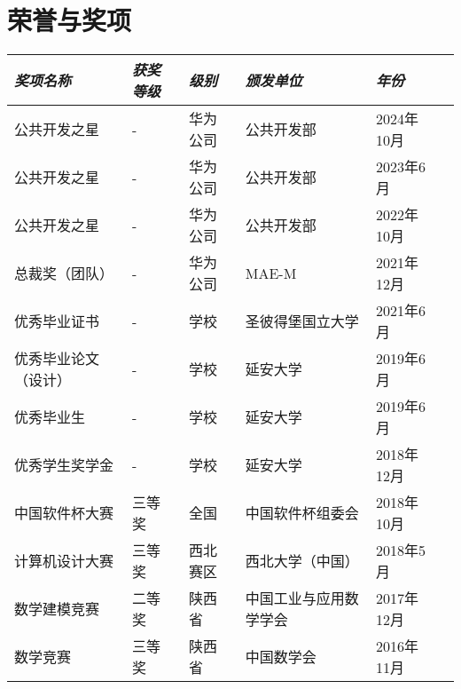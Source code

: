 \documentclass[letterpaper,10pt]{ctexart}
\newcommand{\awardsTable}[1]{
	\begin{tabularx}{\textwidth}{llllll}
	\emph{奖项名称}	& \emph{获奖等级}	& \emph{级别}	& \emph{颁发单位} & \emph{年份}       \\
	\midrule\midrule
	#1
	\end{tabularx}
}
\newcommand{\awardsTableRow}[6]{
	\BeginAccSupp{method=plain, ActualText=11\string\t 21}#1 & #2 & #3 & #4 & #5\EndAccSupp{} \\
}
\begin{document}
\section{荣誉与奖项}
\setlength{\tabcolsep}{6.0pt}
\renewcommand{\arraystretch}{1.1}
\fontsize{8.5}{11}\selectfont
\awardsTable{
  \awardsTableRow{公共开发之星}{-}{华为公司}{公共开发部}{2024年10月} \\
  \awardsTableRow{公共开发之星}{-}{华为公司}{公共开发部}{2023年6月} \\
  \awardsTableRow{公共开发之星}{-}{华为公司}{公共开发部}{2022年10月} \\
  \awardsTableRow{总裁奖（团队）}{-}{华为公司}{MAE-M}{2021年12月} \\
  \awardsTableRow{优秀毕业证书}{-}{学校}{圣彼得堡国立大学}{2021年6月} \\
  \awardsTableRow{优秀毕业论文（设计）}{-}{学校}{延安大学}{2019年6月} \\
  \awardsTableRow{优秀毕业生}{-}{学校}{延安大学}{2019年6月} \\
  \awardsTableRow{优秀学生奖学金}{-}{学校}{延安大学}{2018年12月} \\
  \awardsTableRow{中国软件杯大赛}{三等奖}{全国}{中国软件杯组委会}{2018年10月} \\
  \awardsTableRow{计算机设计大赛}{三等奖}{西北赛区}{西北大学（中国）}{2018年5月} \\
  \awardsTableRow{数学建模竞赛}{二等奖}{陕西省}{中国工业与应用数学学会}{2017年12月} \\
  \awardsTableRow{数学竞赛}{三等奖}{陕西省}{中国数学会}{2016年11月} \\ \hline }
\end{document}
